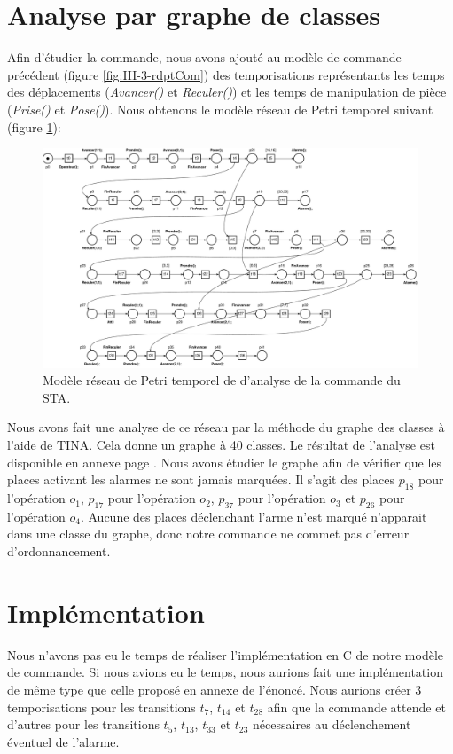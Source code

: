 \section{Analyse par graphe de classes}
Afin d'étudier la commande, nous avons ajouté au modèle de commande précédent (figure \ref{fig:III-3-rdptCom}) des temporisations représentants les temps des déplacements (\emph{Avancer()} et \emph{Reculer()}) et les temps de manipulation de pièce (\emph{Prise()} et \emph{Pose()}). Nous obtenons le modèle réseau de Petri temporel suivant (figure \ref{fig:III-3-rdptAnalyse}):
\begin{figure}[!ht]
\centering
\includegraphics[width=\textwidth]{./III/images/reseau_Commande--III-3.pdf}
\caption{\label{fig:III-3-rdptAnalyse}Modèle réseau de Petri temporel de d'analyse de la commande du STA.}
\end{figure}

Nous avons fait une analyse de ce réseau par la méthode du graphe des classes à l'aide de TINA. Cela donne un graphe à 40 classes. Le résultat de l'analyse est disponible en annexe page \pageref{Annex:III}. Nous avons étudier le graphe afin de vérifier que les places activant les alarmes ne sont jamais marquées. Il s'agit des places $p_18$ pour l'opération $o_1$, $p_17$ pour l'opération $o_2$, $p_37$ pour l'opération $o_3$ et $p_26$ pour l'opération $o_4$. Aucune des places déclenchant l'arme n'est marqué n'apparait dans une classe du graphe, donc notre commande ne commet pas d'erreur d'ordonnancement.


\newpage
\section{Implémentation}
Nous n'avons pas eu le temps de réaliser l'implémentation en C de notre modèle de commande. 
Si nous avions eu le temps, nous aurions fait une implémentation de même type que celle proposé en annexe de l'énoncé. Nous aurions créer 3 temporisations pour les transitions $t_7$, $t_{14}$ et $t_{28}$ afin que la commande attende et d'autres pour les transitions $t_{5}$, $t_{13}$, $t_{33}$ et $t_{23}$ nécessaires au déclenchement éventuel de l'alarme.